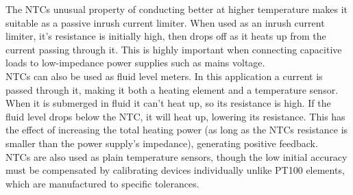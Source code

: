 The NTCs unusual property of conducting better at higher temperature makes it suitable as a passive inrush current limiter.
When used as an inrush current limiter, it's resistance is initially high, then drops off as it heats up from the current passing through it.
This is highly important when connecting capacitive loads to low-impedance power supplies such as mains voltage.\\
NTCs can also be used as fluid level meters.
In this application a current is passed through it, making it both a heating element and a temperature sensor.
When it is submerged in fluid it can't heat up, so its resistance is high.
If the fluid level drops below the NTC, it will heat up, lowering its resistance.
This has the effect of increasing the total heating power (as long as the NTCs resistance is smaller than the power supply's impedance), generating positive feedback.\\
NTCs are also used as plain temperature sensors, though the low initial accuracy must be compensated by calibrating devices individually unlike PT100 elements, which are manufactured to specific tolerances.

